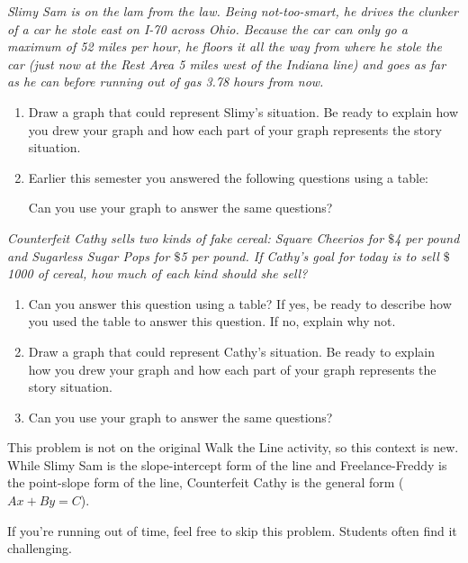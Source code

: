 \documentclass{ximera}
\begin{document}
\begin{problem}
\emph{Slimy Sam is on the lam from the law.  Being not-too-smart, he drives
the clunker of a car he stole east on I-70 across Ohio.  Because the
car can only go a maximum of 52 miles per hour, he floors it all the
way from where he stole the car (just now at the Rest Area 5 miles
west of the Indiana line) and goes as far as he can before running out
of gas 3.78 hours from now.}
 \begin{enumerate}
  \item Draw a graph that could represent Slimy's situation.  Be ready to explain how you drew your graph and how each part of your graph represents the story situation.

  \item Earlier this semester you answered the following questions using a table:  
Can you use your graph to answer the same questions?

\end{enumerate}

\end{problem}


\begin{problem} 
\emph{Counterfeit Cathy sells two kinds of fake cereal: Square Cheerios for
$\$$4 per pound and Sugarless Sugar Pops for $\$$5 per pound.  If Cathy's goal for today is to sell $\$$1000 of cereal, how
  much of each kind should she sell?}

\begin{enumerate}
  \item Can you answer this question using a table? If yes, be ready to describe how you used the table to answer this question. If no, explain why not.
    \item Draw a graph that could represent Cathy's situation.  Be ready to explain how you drew your graph and how each part of your graph represents the story situation.
  \item Can you use your graph to answer the same questions?
  \end{enumerate}
  
  \begin{instructorNotes}
  This problem is not on the original Walk the Line activity, so this context is new.  While Slimy Sam is the slope-intercept form of the line and Freelance-Freddy is the point-slope form of the line, Counterfeit Cathy is the general form ($Ax + By = C$).
  
  If you're running out of time, feel free to skip this problem.  Students often find it challenging.
  \end{instructorNotes}
  
\end{problem}
\end{document}
